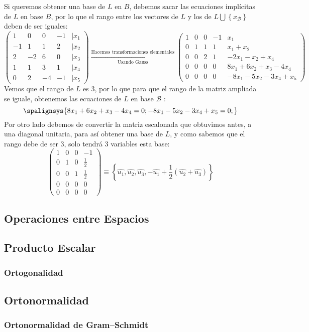 Si queremos obtener una base de \(L\) en \(B\), debemos sacar las ecuaciones implícitas de \(L\) en base \(B\), por lo que el rango entre los vectores de \(L\) y los de \(L \bigcup \left\{x_\mathcal{B}\right\} \) deben de ser iguales:
\[
        \begin{pmatrix}
                1  & 0  & 0  & -1 & | x_1 \\
                -1 & 1  & 1  & 2  & |x_2  \\
                2  & -2 & 6  & 0  & |x_3  \\
                1  & 1  & 3  & 1  & |x_4  \\
                0  & 2  & -4 & -1 & |x_5
        \end{pmatrix}
        \xrightarrow[\text{Usando Gauss}]{\text{Hacemos transformaciones elementales}}
        \begin{pmatrix}
                1 & 0 & 0 & -1 & x_1                      \\
                0 & 1 & 1 & 1  & x_1 + x_2                \\
                0 & 0 & 2 & 1  & -2x_1 - x_2 +x_4         \\
                0 & 0 & 0 & 0  & 8x_1 + 6x_2 + x_3 - 4x_4 \\
                0 & 0 & 0 & 0  & -8x_1 -5x_2 - 3x_4 + x_5
        \end{pmatrix}
\]
Vemos que el rango de \(L\) es 3, por lo que para que el rango de la matriz ampliada se iguale, obtenemos las ecuaciones de \(L\) en base \(\mathcal{B}\) :
\[
        \spalignsys{
                8x_1 + 6x_2 + x_3 - 4x_4 = 0;
                -8x_1 -5x_2 - 3x_4 + x_5 = 0;
        }
\]
Por otro lado debemos de convertir la matriz escalonada que obtuvimos antes, a una diagonal unitaria, para así obtener una base de \(L\), y como sabemos que el rango debe de ser 3, solo tendrá 3 variables esta base:
\[
        \begin{pmatrix}
                1 & 0 & 0 & -1          \\
                0 & 1 & 0 & \frac{1}{2} \\
                0 & 0 & 1 & \frac{1}{2} \\
                0 & 0 & 0 & 0           \\
                0 & 0 & 0 & 0
        \end{pmatrix} \equiv \left \{ \hat{u_1}, \hat{u_2}, \hat{u_3}, -\hat{u_1} + \frac{1}{2}(\hat{u_2} + \hat{u_3}) \right \}
\]
\subsection{Operaciones entre Espacios}
\subsection{Producto Escalar}
\subsubsection{Ortogonalidad}
\subsection{Ortonormalidad}
\subsubsection{Ortonormalidad de Gram–Schmidt}